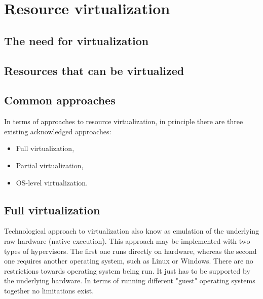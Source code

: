 \documentclass[11pt]{book}
\begin{document}



    \section{Resource virtualization}
    \label{sec:ctx:virt}


      \subsection{The need for virtualization}

      \subsection{Resources that can be virtualized}

      \subsection{Common approaches}

        In terms of approaches to resource virtualization, in principle there are three existing acknowledged
        approaches:

        \begin{itemize}
          \item{Full virtualization,}
          \item{Partial virtualization,}
          \item{OS-level virtualization.}
        \end{itemize}


      \subsection{Full virtualization}

        Technological approach to virtualization also know as emulation of the underlying raw hardware (native
        execution). This approach may be implemented with two types of hypervisors. The first one runs directly on
        hardware, whereas the second one requires another operating system, such as Linux or Windows. There are no
        restrictions towards operating system being run. It just has to be supported by the underlying hardware. In
        terms of running different "guest" operating systems together no limitations exist.
\end{document}

